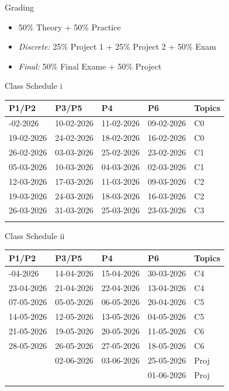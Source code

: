 \documentclass[
  ignorenonframetext,
]{beamer}
\newcounter{none} %
\providecommand{\tightlist}{%
  \setlength{\itemsep}{0pt}\setlength{\parskip}{0pt}}
\begin{document}
\begin{frame}{Grading}
\protect{}\label{grading}
\begin{itemize}
\tightlist
\item
  50\% Theory + 50\% Practice
\item
  \emph{Discrete:} 25\% Project 1 + 25\% Project 2 + 50\% Exam
\item
  \emph{Final:} 50\% Final Exame + 50\% Project
\end{itemize}
\end{frame}

\begin{frame}{Class Schedule i}
\protect{}\label{class-schedule-i}
{\def\LTcaptype{none} %
\begin{longtable}[]{@{}lllll@{}}
\toprule\noalign{}
P1/P2 & P3/P5 & P4 & P6 & Topics \\
\midrule\noalign{}
\endhead
12-02-2026 & 10-02-2026 & 11-02-2026 & 09-02-2026 & C0 \\
19-02-2026 & 24-02-2026 & 18-02-2026 & 16-02-2026 & C0 \\
26-02-2026 & 03-03-2026 & 25-02-2026 & 23-02-2026 & C1 \\
05-03-2026 & 10-03-2026 & 04-03-2026 & 02-03-2026 & C1 \\
12-03-2026 & 17-03-2026 & 11-03-2026 & 09-03-2026 & C2 \\
19-03-2026 & 24-03-2026 & 18-03-2026 & 16-03-2026 & C2 \\
26-03-2026 & 31-03-2026 & 25-03-2026 & 23-03-2026 & C3 \\
\bottomrule\noalign{}
\end{longtable}
}
\end{frame}

\begin{frame}{Class Schedule ii}
\protect{}\label{class-schedule-ii}
{\def\LTcaptype{none} %
\begin{longtable}[]{@{}lllll@{}}
\toprule\noalign{}
P1/P2 & P3/P5 & P4 & P6 & Topics \\
\midrule\noalign{}
\endhead
16-04-2026 & 14-04-2026 & 15-04-2026 & 30-03-2026 & C4 \\
23-04-2026 & 21-04-2026 & 22-04-2026 & 13-04-2026 & C4 \\
07-05-2026 & 05-05-2026 & 06-05-2026 & 20-04-2026 & C5 \\
14-05-2026 & 12-05-2026 & 13-05-2026 & 04-05-2026 & C5 \\
21-05-2026 & 19-05-2026 & 20-05-2026 & 11-05-2026 & C6 \\
28-05-2026 & 26-05-2026 & 27-05-2026 & 18-05-2026 & C6 \\
& 02-06-2026 & 03-06-2026 & 25-05-2026 & Proj \\
& & & 01-06-2026 & Proj \\
\bottomrule\noalign{}
\end{longtable}
}
\end{frame}
\end{document}
